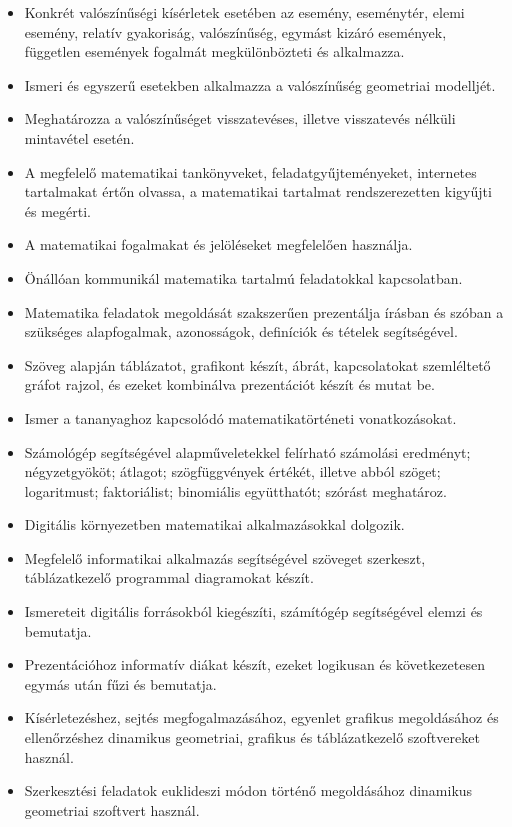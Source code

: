 \begin{itemize}
\item
  Konkrét valószínűségi kísérletek esetében az esemény, eseménytér,
  elemi esemény, relatív gyakoriság, valószínűség, egymást kizáró
  események, független események fogalmát megkülönbözteti és alkalmazza.
\item
  Ismeri és egyszerű esetekben alkalmazza a valószínűség geometriai
  modelljét.
\item
  Meghatározza a valószínűséget visszatevéses, illetve visszatevés
  nélküli mintavétel esetén.
\item
  A megfelelő matematikai tankönyveket, feladatgyűjteményeket,
  internetes tartalmakat értőn olvassa, a matematikai tartalmat
  rendszerezetten kigyűjti és megérti.
\item
  A matematikai fogalmakat és jelöléseket megfelelően használja.
\item
  Önállóan kommunikál matematika tartalmú feladatokkal kapcsolatban.
\item
  Matematika feladatok megoldását szakszerűen prezentálja írásban és
  szóban a szükséges alapfogalmak, azonosságok, definíciók és tételek
  segítségével.
\item
  Szöveg alapján táblázatot, grafikont készít, ábrát, kapcsolatokat
  szemléltető gráfot rajzol, és ezeket kombinálva prezentációt készít és
  mutat be.
\item
  Ismer a tananyaghoz kapcsolódó matematikatörténeti vonatkozásokat.
\item
  Számológép segítségével alapműveletekkel felírható számolási
  eredményt; négyzetgyököt; átlagot; szögfüggvények értékét, illetve
  abból szöget; logaritmust; faktoriálist; binomiális együtthatót;
  szórást meghatároz.
\item
  Digitális környezetben matematikai alkalmazásokkal dolgozik.
\item
  Megfelelő informatikai alkalmazás segítségével szöveget szerkeszt,
  táblázatkezelő programmal diagramokat készít.
\item
  Ismereteit digitális forrásokból kiegészíti, számítógép segítségével
  elemzi és bemutatja.
\item
  Prezentációhoz informatív diákat készít, ezeket logikusan és
  következetesen egymás után fűzi és bemutatja.
\item
  Kísérletezéshez, sejtés megfogalmazásához, egyenlet grafikus
  megoldásához és ellenőrzéshez dinamikus geometriai, grafikus és
  táblázatkezelő szoftvereket használ.
\item
  Szerkesztési feladatok euklideszi módon történő megoldásához dinamikus
  geometriai szoftvert használ.
\end{itemize}


